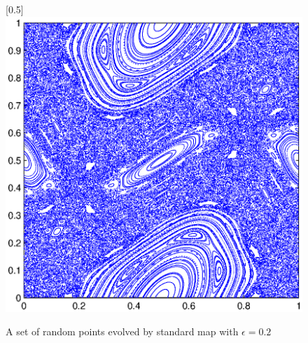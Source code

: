 \documentclass{article}
\begin{document}
\begin{figure}
\caption{\label{standardmapdotplot} A set of random points evolved
by standard map with $\epsilon=0.2$}
\centerline{\scalebox{0.5}[0.5]{\includegraphics{standardmapdotplot.eps}}}
\end{figure}


\end{document}
